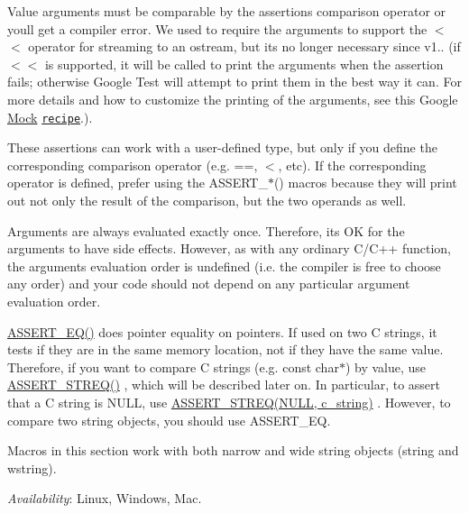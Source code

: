 Value arguments must be comparable by the assertion\textquotesingle{}s comparison operator or you\textquotesingle{}ll get a compiler error. We used to require the arguments to support the {\ttfamily $<$$<$} operator for streaming to an {\ttfamily ostream}, but it\textquotesingle{}s no longer necessary since v1.. (if {\ttfamily $<$$<$} is supported, it will be called to print the arguments when the assertion fails; otherwise Google Test will attempt to print them in the best way it can. For more details and how to customize the printing of the arguments, see this Google \hyperlink{class_mock}{Mock} \href{../../googlemock/docs/CookBook.md#teaching-google-mock-how-to-print-your-values}{\tt recipe}.).

These assertions can work with a user-\/defined type, but only if you define the corresponding comparison operator (e.\+g. {\ttfamily ==}, {\ttfamily $<$}, etc). If the corresponding operator is defined, prefer using the {\ttfamily A\+S\+S\+E\+R\+T\+\_\+$\ast$()} macros because they will print out not only the result of the comparison, but the two operands as well.

Arguments are always evaluated exactly once. Therefore, it\textquotesingle{}s OK for the arguments to have side effects. However, as with any ordinary C/\+C++ function, the arguments\textquotesingle{} evaluation order is undefined (i.\+e. the compiler is free to choose any order) and your code should not depend on any particular argument evaluation order.

{\ttfamily \hyperlink{gtest_8h_a1a6db8b1338ee7040329322b77779086}{A\+S\+S\+E\+R\+T\+\_\+\+E\+Q()}} does pointer equality on pointers. If used on two C strings, it tests if they are in the same memory location, not if they have the same value. Therefore, if you want to compare C strings (e.\+g. {\ttfamily const char$\ast$}) by value, use {\ttfamily \hyperlink{gtest_8h_a74f4189ea570bab9a65d47104659ef9c}{A\+S\+S\+E\+R\+T\+\_\+\+S\+T\+R\+E\+Q()}} , which will be described later on. In particular, to assert that a C string is {\ttfamily N\+U\+LL}, use {\ttfamily \hyperlink{gtest_8h_a74f4189ea570bab9a65d47104659ef9c}{A\+S\+S\+E\+R\+T\+\_\+\+S\+T\+R\+E\+Q(\+N\+U\+L\+L, c\+\_\+string)}} . However, to compare two {\ttfamily string} objects, you should use {\ttfamily A\+S\+S\+E\+R\+T\+\_\+\+EQ}.

Macros in this section work with both narrow and wide string objects ({\ttfamily string} and {\ttfamily wstring}).

{\itshape Availability}\+: Linux, Windows, Mac.

